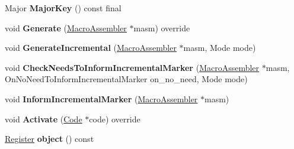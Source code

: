 \begin{DoxyCompactItemize}
\item 
Major {\bfseries Major\+Key} () const  final\hypertarget{classv8_1_1internal_1_1_record_write_stub_aa48ea86c84fbc9af6c238be1b4b8fa8d}{}\label{classv8_1_1internal_1_1_record_write_stub_aa48ea86c84fbc9af6c238be1b4b8fa8d}

\item 
void {\bfseries Generate} (\hyperlink{classv8_1_1internal_1_1_macro_assembler}{Macro\+Assembler} $\ast$masm) override\hypertarget{classv8_1_1internal_1_1_record_write_stub_a71cb55552be288a12876045441a66dca}{}\label{classv8_1_1internal_1_1_record_write_stub_a71cb55552be288a12876045441a66dca}

\item 
void {\bfseries Generate\+Incremental} (\hyperlink{classv8_1_1internal_1_1_macro_assembler}{Macro\+Assembler} $\ast$masm, Mode mode)\hypertarget{classv8_1_1internal_1_1_record_write_stub_a05cf08ed0350334ba02a2e918b42ffcc}{}\label{classv8_1_1internal_1_1_record_write_stub_a05cf08ed0350334ba02a2e918b42ffcc}

\item 
void {\bfseries Check\+Needs\+To\+Inform\+Incremental\+Marker} (\hyperlink{classv8_1_1internal_1_1_macro_assembler}{Macro\+Assembler} $\ast$masm, On\+No\+Need\+To\+Inform\+Incremental\+Marker on\+\_\+no\+\_\+need, Mode mode)\hypertarget{classv8_1_1internal_1_1_record_write_stub_aa80cd82bd6fa0cdc17b5cb2d17540d59}{}\label{classv8_1_1internal_1_1_record_write_stub_aa80cd82bd6fa0cdc17b5cb2d17540d59}

\item 
void {\bfseries Inform\+Incremental\+Marker} (\hyperlink{classv8_1_1internal_1_1_macro_assembler}{Macro\+Assembler} $\ast$masm)\hypertarget{classv8_1_1internal_1_1_record_write_stub_a18e17a353df1617947581e3e6b9e9183}{}\label{classv8_1_1internal_1_1_record_write_stub_a18e17a353df1617947581e3e6b9e9183}

\item 
void {\bfseries Activate} (\hyperlink{classv8_1_1internal_1_1_code}{Code} $\ast$code) override\hypertarget{classv8_1_1internal_1_1_record_write_stub_aee832e64590d152a601ed41c5e4fdac9}{}\label{classv8_1_1internal_1_1_record_write_stub_aee832e64590d152a601ed41c5e4fdac9}

\item 
\hyperlink{structv8_1_1internal_1_1_register}{Register} {\bfseries object} () const \hypertarget{classv8_1_1internal_1_1_record_write_stub_a6d3a7affc9526b332c46fbe8f54f0b19}{}\label{classv8_1_1internal_1_1_record_write_stub_a6d3a7affc9526b332c46fbe8f54f0b19}


\end{DoxyCompactItemize}

